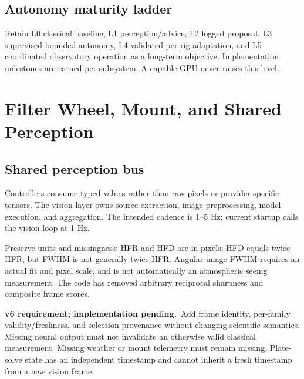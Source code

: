 \documentclass[11pt,a4paper]{article}
\newcommand{\code}[1]{\texttt{\detokenize{#1}}}
\newcommand{\planned}{\textbf{v6 requirement; implementation pending.}\ }
\begin{document}
\subsection{Autonomy maturity ladder}
Retain L0 classical baseline, L1 perception/advice, L2 logged proposal,
L3 supervised bounded autonomy, L4 validated per-rig adaptation, and L5
coordinated observatory operation as a long-term objective. Implementation
milestones are earned per subsystem. A capable GPU never raises this level.

\section{Filter Wheel, Mount, and Shared Perception}
\subsection{Shared perception bus}
Controllers consume typed \code{SharedObservation} values rather than raw
pixels or provider-specific tensors. The vision layer owns source extraction,
image preprocessing, model execution, and aggregation. The intended cadence
is 1--5 Hz; current startup calls the vision loop at 1 Hz.

Preserve units and missingness: HFR and HFD are in pixels; HFD equals twice HFR,
but FWHM is not generally twice HFR. Angular image FWHM requires an actual fit
and pixel scale, and is not automatically an atmospheric seeing measurement.
The code has removed arbitrary reciprocal sharpness and composite frame scores.

\planned Add frame identity, per-family validity/freshness, and selection
provenance without changing scientific semantics. Missing neural output must
not invalidate an otherwise valid classical measurement. Missing weather or
mount telemetry must remain missing. Plate-solve state has an independent
timestamp and cannot inherit a fresh timestamp from a new vision frame.
\end{document}
